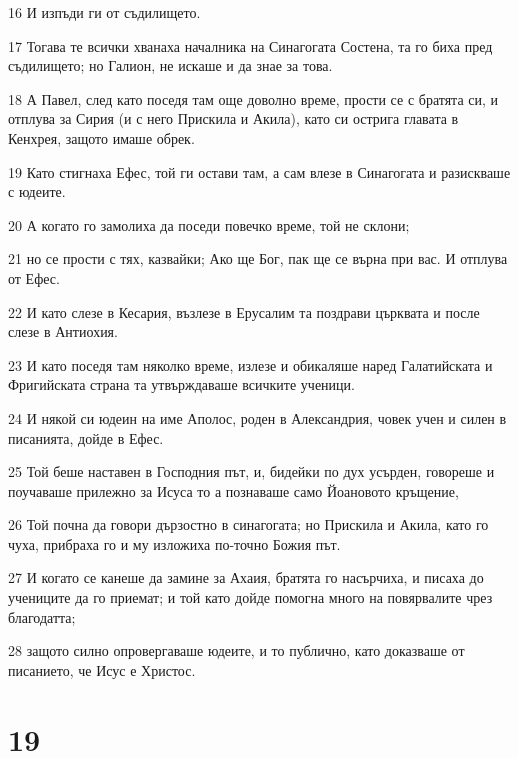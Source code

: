 \par 16 И изпъди ги от съдилището.
\par 17 Тогава те всички хванаха началника на Синагогата Состена, та го биха пред съдилището; но Галион, не искаше и да знае за това.
\par 18 А Павел, след като поседя там още доволно време, прости се с братята си, и отплува за Сирия (и с него Прискила и Акила), като си острига главата в Кенхрея, защото имаше обрек.
\par 19 Като стигнаха Ефес, той ги остави там, а сам влезе в Синагогата и разискваше с юдеите.
\par 20 А когато го замолиха да поседи повечко време, той не склони;
\par 21 но се прости с тях, казвайки; Ако ще Бог, пак ще се върна при вас. И отплува от Ефес.
\par 22 И като слезе в Кесария, възлезе в Ерусалим та поздрави църквата и после слезе в Антиохия.
\par 23 И като поседя там няколко време, излезе и обикаляше наред Галатийската и Фригийската страна та утвърждаваше всичките ученици.
\par 24 И някой си юдеин на име Аполос, роден в Александрия, човек учен и силен в писанията, дойде в Ефес.
\par 25 Той беше наставен в Господния път, и, бидейки по дух усърден, говореше и поучаваше прилежно за Исуса то а познаваше само Йоановото кръщение,
\par 26 Той почна да говори дързостно в синагогата; но Прискила и Акила, като го чуха, прибраха го и му изложиха по-точно Божия път.
\par 27 И когато се канеше да замине за Ахаия, братята го насърчиха, и писаха до учениците да го приемат; и той като дойде помогна много на повярвалите чрез благодатта;
\par 28 защото силно опровергаваше юдеите, и то публично, като доказваше от писанието, че Исус е Христос.

\chapter{19}

